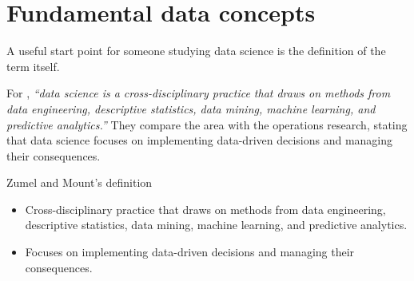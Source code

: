 \chapter{Fundamental data concepts}
\label{chap:data}



A useful start point for someone studying data science is the definition of the term
itself.

%
%
%
%
%

For \textcite{Zumel2019}, \emph{``data science is a cross-disciplinary practice that draws
on methods from data engineering, descriptive statistics, data mining, machine learning,
and predictive analytics.''}  They compare the area with the operations research, stating
that data science focuses on implementing data-driven decisions and managing their
consequences.

\begin{slidebox}{Zumel and Mount's definition}{}
  \begin{itemize}
    \item Cross-disciplinary practice that draws on methods from data
    engineering, descriptive statistics, data mining, machine learning, and predictive
    analytics.
    \item Focuses on implementing data-driven decisions and managing their consequences.
  \end{itemize}
\end{slidebox}

